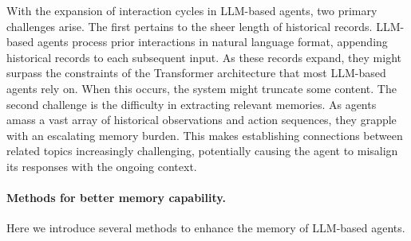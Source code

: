 With the expansion of interaction cycles in LLM-based agents, two primary challenges arise. The first pertains to the sheer length of historical records. LLM-based agents process prior interactions in natural language format, appending historical records to each subsequent input. As these records expand, they might surpass the constraints of the Transformer architecture that most LLM-based agents rely on. When this occurs, the system might truncate some content. The second challenge is the difficulty in extracting relevant memories. As agents amass a vast array of historical observations and action sequences, they grapple with an escalating memory burden. This makes establishing connections between related topics increasingly challenging, potentially causing the agent to misalign its responses with the ongoing context.

\paragraph{Methods for better memory capability.} 
Here we introduce several methods to enhance the memory of LLM-based agents.

